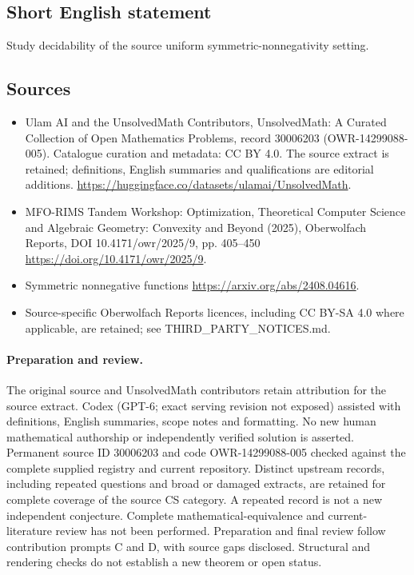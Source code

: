 \documentclass[11pt]{article}
\begin{document}
\subsection{Short English statement}
Study decidability of the source uniform symmetric-nonnegativity setting.
\subsection{Sources}
\begin{itemize}
\item[\hypertarget{source:30006203:1}{S1}] Ulam AI and the UnsolvedMath Contributors, UnsolvedMath: A Curated Collection of Open Mathematics Problems, record 30006203 (OWR-14299088-005). Catalogue curation and metadata: CC BY 4.0. The source extract is retained; definitions, English summaries and qualifications are editorial additions.
\url{https://huggingface.co/datasets/ulamai/UnsolvedMath}.
\item[\hypertarget{source:30006203:2}{S2}] MFO-RIMS Tandem Workshop: Optimization, Theoretical Computer Science and Algebraic Geometry: Convexity and Beyond (2025), Oberwolfach Reports, DOI 10.4171/owr/2025/9, pp. 405--450
\url{https://doi.org/10.4171/owr/2025/9}.
\item[\hypertarget{source:30006203:3}{S3}] Symmetric nonnegative functions
\url{https://arxiv.org/abs/2408.04616}.
\item Source-specific Oberwolfach Reports licences, including CC BY-SA 4.0 where applicable, are retained; see THIRD\_PARTY\_NOTICES.md.
\end{itemize}
\paragraph{Preparation and review.}
The original source and UnsolvedMath contributors retain attribution for the source extract. Codex (GPT-6; exact serving revision not exposed) assisted with definitions, English summaries, scope notes and formatting. No new human mathematical authorship or independently verified solution is asserted. Permanent source ID 30006203 and code OWR-14299088-005 checked against the complete supplied registry and current repository. Distinct upstream records, including repeated questions and broad or damaged extracts, are retained for complete coverage of the source CS category. A repeated record is not a new independent conjecture. Complete mathematical-equivalence and current-literature review has not been performed. Preparation and final review follow contribution prompts C and D, with source gaps disclosed. Structural and rendering checks do not establish a new theorem or open status.
\label{end:30006203}
\end{document}
